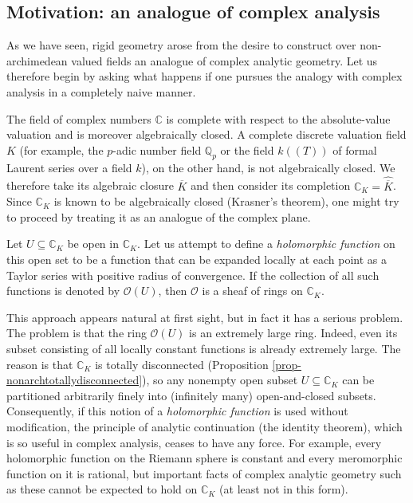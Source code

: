 \documentclass[a4paper,12pt, dvipdfmx]{jsbook}
\def\Q{\mathbb{Q}}
\def\C{\mathbb{C}}
\def\O{\mathscr{O}}
\def\ovl#1{\overline{#1}}%
\theoremstyle{plain}
\theoremstyle{definition}
\begin{document}
\subsection{Motivation: an analogue of complex analysis}\label{approachcomplexanalysis}
As we have seen, rigid geometry arose from the desire to construct over non-archimedean valued fields an analogue of complex analytic geometry.
Let us therefore begin by asking what happens if one pursues the analogy with complex analysis in a completely naive manner.

The field of complex numbers $\C$ is complete with respect to the absolute-value valuation and is moreover algebraically closed.
A complete discrete valuation field $K$ (for example, the $p$-adic number field $\Q_p$ or the field $k(\!(T)\!)$ of formal Laurent series over a field $k$), on the other hand, is not algebraically closed. We therefore take its algebraic closure $\ovl{K}$ and then consider its completion $\C_K=\widehat{\ovl{K}}$.
Since $\C_K$ is known to be algebraically closed (Krasner's theorem), one might try to proceed by treating it as an analogue of the complex plane.

Let $U\subseteq\C_K$ be open in $\C_K$. Let us attempt to define a {\it holomorphic function} on this open set to be a function that can be expanded locally at each point as a Taylor series with positive radius of convergence.
If the collection of all such functions is denoted by $\O(U)$, then $\O$ is a sheaf of rings on $\C_K$.

This approach appears natural at first sight, but in fact it has a serious problem.
The problem is that the ring $\O(U)$ is an extremely large ring.
Indeed, even its subset consisting of all locally constant functions is already extremely large.
The reason is that $\C_K$ is totally disconnected (Proposition \ref{prop-nonarchtotallydisconnected}), so any nonempty open subset $U\subseteq\C_K$ can be partitioned arbitrarily finely into (infinitely many) open-and-closed subsets.
Consequently, if this notion of a {\it holomorphic function} is used without modification, the principle of analytic continuation (the identity theorem), which is so useful in complex analysis, ceases to have any force.
For example, every holomorphic function on the Riemann sphere is constant and every meromorphic function on it is rational, but important facts of complex analytic geometry such as these cannot be expected to hold on $\C_K$ (at least not in this form).
\end{document}
